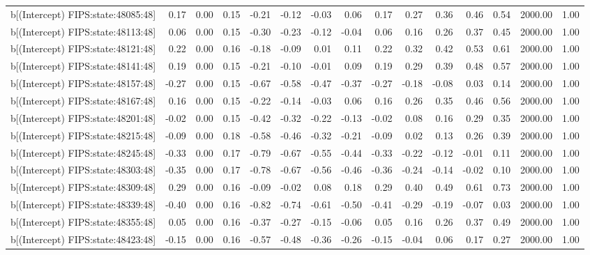 \begin{table}[ht]
\begin{tabular}{rrrrrrrrrrrrrrr}
  b[(Intercept) FIPS:state:48085:48] & 0.17 & 0.00 & 0.15 & -0.21 & -0.12 & -0.03 & 0.06 & 0.17 & 0.27 & 0.36 & 0.46 & 0.54 & 2000.00 & 1.00 \\ 
  b[(Intercept) FIPS:state:48113:48] & 0.06 & 0.00 & 0.15 & -0.30 & -0.23 & -0.12 & -0.04 & 0.06 & 0.16 & 0.26 & 0.37 & 0.45 & 2000.00 & 1.00 \\ 
  b[(Intercept) FIPS:state:48121:48] & 0.22 & 0.00 & 0.16 & -0.18 & -0.09 & 0.01 & 0.11 & 0.22 & 0.32 & 0.42 & 0.53 & 0.61 & 2000.00 & 1.00 \\ 
  b[(Intercept) FIPS:state:48141:48] & 0.19 & 0.00 & 0.15 & -0.21 & -0.10 & -0.01 & 0.09 & 0.19 & 0.29 & 0.39 & 0.48 & 0.57 & 2000.00 & 1.00 \\ 
  b[(Intercept) FIPS:state:48157:48] & -0.27 & 0.00 & 0.15 & -0.67 & -0.58 & -0.47 & -0.37 & -0.27 & -0.18 & -0.08 & 0.03 & 0.14 & 2000.00 & 1.00 \\ 
  b[(Intercept) FIPS:state:48167:48] & 0.16 & 0.00 & 0.15 & -0.22 & -0.14 & -0.03 & 0.06 & 0.16 & 0.26 & 0.35 & 0.46 & 0.56 & 2000.00 & 1.00 \\ 
  b[(Intercept) FIPS:state:48201:48] & -0.02 & 0.00 & 0.15 & -0.42 & -0.32 & -0.22 & -0.13 & -0.02 & 0.08 & 0.16 & 0.29 & 0.35 & 2000.00 & 1.00 \\ 
  b[(Intercept) FIPS:state:48215:48] & -0.09 & 0.00 & 0.18 & -0.58 & -0.46 & -0.32 & -0.21 & -0.09 & 0.02 & 0.13 & 0.26 & 0.39 & 2000.00 & 1.00 \\ 
  b[(Intercept) FIPS:state:48245:48] & -0.33 & 0.00 & 0.17 & -0.79 & -0.67 & -0.55 & -0.44 & -0.33 & -0.22 & -0.12 & -0.01 & 0.11 & 2000.00 & 1.00 \\ 
  b[(Intercept) FIPS:state:48303:48] & -0.35 & 0.00 & 0.17 & -0.78 & -0.67 & -0.56 & -0.46 & -0.36 & -0.24 & -0.14 & -0.02 & 0.10 & 2000.00 & 1.00 \\ 
  b[(Intercept) FIPS:state:48309:48] & 0.29 & 0.00 & 0.16 & -0.09 & -0.02 & 0.08 & 0.18 & 0.29 & 0.40 & 0.49 & 0.61 & 0.73 & 2000.00 & 1.00 \\ 
  b[(Intercept) FIPS:state:48339:48] & -0.40 & 0.00 & 0.16 & -0.82 & -0.74 & -0.61 & -0.50 & -0.41 & -0.29 & -0.19 & -0.07 & 0.03 & 2000.00 & 1.00 \\ 
  b[(Intercept) FIPS:state:48355:48] & 0.05 & 0.00 & 0.16 & -0.37 & -0.27 & -0.15 & -0.06 & 0.05 & 0.16 & 0.26 & 0.37 & 0.49 & 2000.00 & 1.00 \\ 
  b[(Intercept) FIPS:state:48423:48] & -0.15 & 0.00 & 0.16 & -0.57 & -0.48 & -0.36 & -0.26 & -0.15 & -0.04 & 0.06 & 0.17 & 0.27 & 2000.00 & 1.00 \\ 

\end{tabular}
\end{table}
